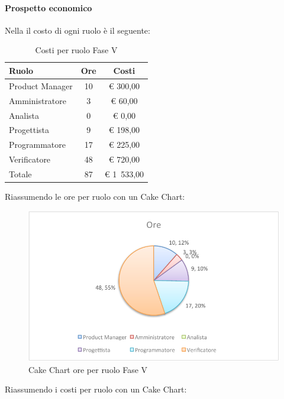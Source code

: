 			\paragraph{Prospetto economico}
				Nella  il costo di ogni ruolo è il seguente:
				\begin{table}[H]
					\begin{center}
						\begin{tabular}{| l | c | c |}
							\hline
							Ruolo 			& Ore 	& Costi  \\ \hline
							
							Product Manager	& 10 		& \euro{} 300,00 	\\
							Amministratore 		& 3 		& \euro{} 60,00 	\\
							Analista	 		& 0		& \euro{} 0,00	\\
							Progettista 		& 9 		& \euro{} 198,00  	\\
							Programmatore		& 17 		& \euro{} 225,00 	\\
							Verificatore		& 48 		& \euro{} 720,00 	\\ \hline \hline
							
							Totale	 		& 87 		& \euro{} 1~533,00 	\\ \hline
						\end{tabular}
					\end{center}
					\caption{Costi per ruolo Fase V}
				\end{table}
				Riassumendo le ore per ruolo con un Cake Chart:
				\begin{figure}[H]\centering
					\includegraphics[width=\textwidth]{PianoDiProgetto/Pics/ChartTotOreFaseV.pdf}
					\caption{Cake Chart ore per ruolo Fase V}
				\end{figure}
				Riassumendo i costi per ruolo con un Cake Chart:
